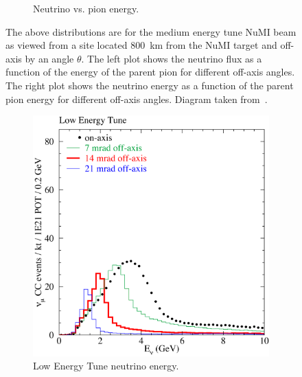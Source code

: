 \begin{figure}
\begin{subfigure}[b]{0.45\textwidth}
  \caption{Neutrino vs. pion energy.}
  \label{fig:NuPiFluxb}
  \end{subfigure}
  \caption{The above distributions are for the medium energy tune NuMI
    beam as viewed from a site located
    800~km from the NuMI target and off-axis by an angle $\theta$. The
    left plot shows the neutrino flux as a function of the energy of
    the parent pion for different off-axis angles. The right plot
    shows the neutrino energy as a function of the parent pion energy
    for different off-axis angles. Diagram taken from~\cite{TDR}.
  }
  \label{fig:NuPiFlux}
\end{figure}



\begin{figure}
  \centering
  \begin{subfigure}[b]{0.45\textwidth}
    \includegraphics[width=\textwidth]{../../img/baird/beam/040-le-spectra.png}
    \caption{Low Energy Tune neutrino energy.  }
    \label{fig:NuESpectra_MEAndLE_a}
  \end{subfigure}
  \hfill
  \begin{subfigure}[b]{0.45\textwidth}

\end{subfigure}
\end{figure}
